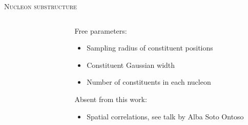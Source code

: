 \documentclass[aspectratio=169]{beamer}
\begin{document}
\begin{frame}[t, plain]{\scshape Nucleon substructure}
\begin{columns}[t]
\begin{column}{.23\textwidth}
\begin{figure}
      \end{figure}
    \end{column}
    \begin{column}{.37\textwidth}
      \centering
      \textcolor{theme}{Free parameters:}\\[1ex]
      \begin{itemize}
        \small
        \item Sampling radius of constituent positions
        \item Constituent Gaussian width
        \item Number of constituents in each nucleon
      \end{itemize}
      \bigskip
      \textcolor{theme}{Absent from this work:}\\[1ex]
      \begin{itemize}
        \small
        \item Spatial correlations,
          see talk by Alba Soto Ontoso
      \end{itemize}
    \end{column}
  \end{columns}
\end{frame}
\end{document}
